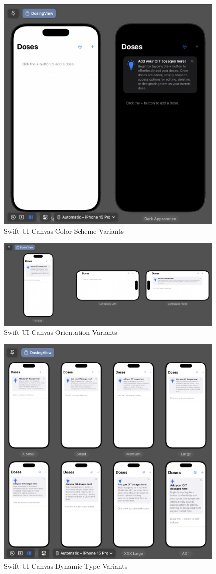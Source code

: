 \begin{figure} [H]
    \centering
    \includegraphics[width=0.5\linewidth]{thesis//chapters//images/SwiftUICanvasColorSchemeVariants.png}
    \caption{Swift UI Canvas Color Scheme Variants}
    \label{fig:swiftUICanvasColorVar}
\end{figure}

\begin{figure} [H]
    \centering
    \includegraphics[width=1\linewidth]{thesis//chapters//images/SwiftUICanvasOrientationVariants.png}
    \caption{Swift UI Canvas Orientation Variants}
    \label{fig:swiftUICanvasOrientationVar}
\end{figure}

\begin{figure} [H]
    \centering
    \includegraphics[width=0.75\linewidth]{thesis//chapters//images/SwiftUIDynamicTypeVariants.png}
    \caption{Swift UI Canvas Dynamic Type Variants}
    \label{fig:swiftUICanvasDTVar}
\end{figure}

